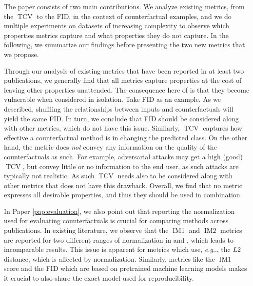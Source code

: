 \documentclass[11pt,a4paper,twoside,openright,final]{memoir}
\makeatletter
\DeclareRobustCommand\onedot{\futurelet\@let@token\@onedot}
\def\@onedot{\ifx\@let@token.\else.\null\fi\xspace}
\def\eg{\emph{e.g}\onedot} \def\Eg{\emph{E.g}\onedot}
\newcommand*{\paperref}[1]{Paper \hyperref[#1]{\ref{#1}}}
\makeatother
\begin{document}
The paper consists of two main contributions.
We analyze existing metrics, from the $\operatorname{TCV}$ to the FID, in the context of counterfactual examples, and we do multiple experiments on datasets of increasing complexity to observe which properties metrics capture and what properties they do not capture.
In the following, we summarize our findings before presenting the two new metrics that we propose.

Through our analysis of existing metrics that have been reported in at least two publications, we generally find that all metrics capture properties at the cost of leaving other properties unattended.
The consequence here of is that they become vulnerable when considered in isolation.
Take FID as an example.
As we described, shuffling the relationships between inputs and counterfactuals will yield the same FID.
In turn, we conclude that FID should be considered along with other metrics, which do not have this issue.
Similarly, $\operatorname{TCV}$ captures how effective a counterfactual method is in changing the predicted class. 
On the other hand, the metric does \emph{not} convey any information on the quality of the counterfactuals as such.
For example, adversarial attacks may get a high (good) $\operatorname{TCV}$, but convey little or no information to the end user, as such attacks are typically not realistic.
As such $\operatorname{TCV}$ needs also to be considered along with other metrics that does not have this drawback.
Overall, we find that no metric expresses all desirable properties, and thus they should be used in combination.

In \paperref{pap:evaluation}, we also point out that reporting the normalization used for evaluating counterfactuals is crucial for comparing methods across publications.
In existing literature, we observe that the $\operatorname{IM1}$ and $\operatorname{IM2}$ metrics are reported for two different ranges of normalization in \cite{Mahajan2019} and \cite{VanLooveren2019}, which leads to incomparable results.
This issue is apparent for metrics which use, \eg, the $L2$ distance, which is affected by normalization.
Similarly, metrics like the $\operatorname{IM1}$ score and the FID which are based on pretrained machine learning models makes it crucial to also share the exact model used for reproducibility.
\end{document}

